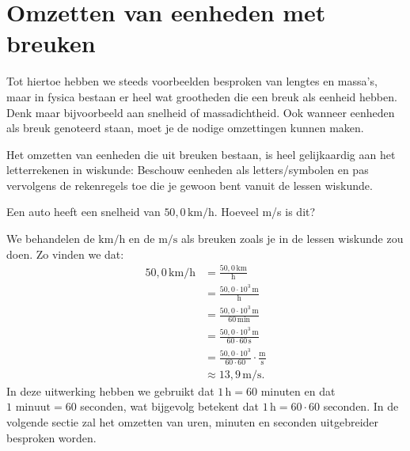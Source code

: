 \documentclass{ximera}
\begin{document}
\section{Omzetten van eenheden met breuken}
Tot hiertoe hebben we steeds voorbeelden besproken van lengtes en massa's, maar in fysica bestaan er heel wat grootheden die een breuk als eenheid hebben. Denk maar bijvoorbeeld aan snelheid of massadichtheid. Ook wanneer eenheden als breuk genoteerd staan, moet je de nodige omzettingen kunnen maken.

Het omzetten van eenheden die uit breuken bestaan, is heel gelijkaardig aan het letterrekenen in wiskunde: Beschouw eenheden als letters/symbolen en pas vervolgens de rekenregels toe die je gewoon bent vanuit de lessen wiskunde.

\begin{example}[foldable=true,title={Voorbeeld: km/h naar m/s}]\nl
    Een auto heeft een snelheid van $50{,}0 \, \mathrm{km/h}$. Hoeveel m/s is dit?

    \begin{solution}\nl
        We behandelen de $\mathrm{km/h}$ en de $\mathrm{m/s}$ als breuken zoals je in de lessen wiskunde zou doen. Zo vinden we dat:
        \begin{align*}
        50{,}0 \, \mathrm{km/h} & = \frac{50{,}0 \, \mathrm{km}}{\mathrm{h}} \\
        & = \frac{50{,}0 \cdot 10^{3} \, \mathrm{m}}{\mathrm{h}} \\
        & = \frac{50{,}0 \cdot 10^{3} \, \mathrm{m}}{60 \, \mathrm{min}} \\
        & = \frac{50{,}0 \cdot 10^{3} \, \mathrm{m}}{60 \cdot 60 \, \mathrm{s}} \\
        & = \frac{50{,}0 \cdot 10^{3}}{60 \cdot 60} \cdot \frac{\mathrm{m}}{\mathrm{s}} \\
        & \approx 13{,}9 \, \mathrm{m/s}.
        \end{align*}
        In deze uitwerking hebben we gebruikt dat $1 \, \mathrm{h} = 60$ minuten en dat $1 \text{ minuut} = 60$ seconden, wat bijgevolg betekent dat $1 \, \mathrm{h} = 60 \cdot 60$ seconden. In de volgende sectie zal het omzetten van uren, minuten en seconden uitgebreider besproken worden.
    \end{solution}
\end{example}
\end{document}

